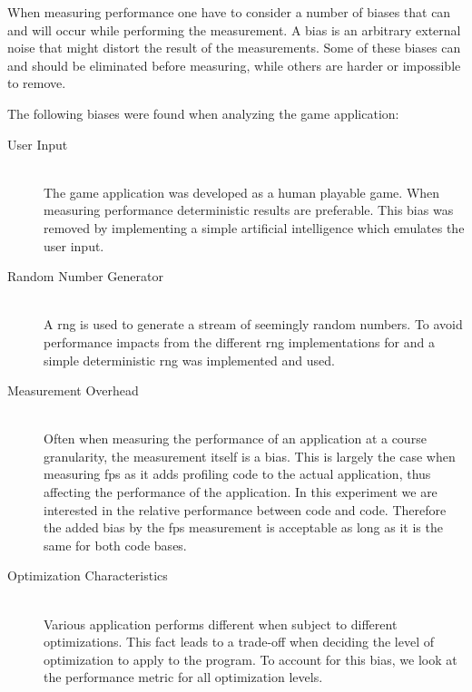When measuring performance one have to consider a number of biases that can and will occur while performing the measurement.
A bias is an arbitrary external noise that might distort the result of the measurements.
Some of these biases can and should be eliminated before measuring, while others are harder or impossible to remove.

The following biases were found when analyzing the game application:
\begin{description}
  \item [User Input] \hfill \\
The game application was developed as a human playable game.
When measuring performance deterministic results are preferable.
This bias was removed by implementing a simple artificial intelligence which emulates the user input.

  \item [Random Number Generator] \hfill \\
A \gls{rng} is used to generate a stream of seemingly random numbers.
To avoid performance impacts from the different \gls{rng} implementations for {\C} and {\rust} a simple deterministic \gls{rng} was implemented and used.

  \item [Measurement Overhead] \hfill \\
Often when measuring the performance of an application at a course granularity, the measurement itself is a bias.
This is largely the case when measuring \gls{fps} as it adds profiling code to the actual application, thus affecting the performance of the application.
In this experiment we are interested in the relative performance between {\C} code and {\rust} code.
Therefore the added bias by the \gls{fps} measurement is acceptable as long as it is the same for both code bases.

  \item [Optimization Characteristics] \hfill \\
Various application performs different when subject to different optimizations.
This fact leads to a trade-off when deciding the level of optimization to apply to the program.
To account for this bias, we look at the performance metric for all optimization levels.
\end{description}

\begin{description}
    \item[]
\end{description}

